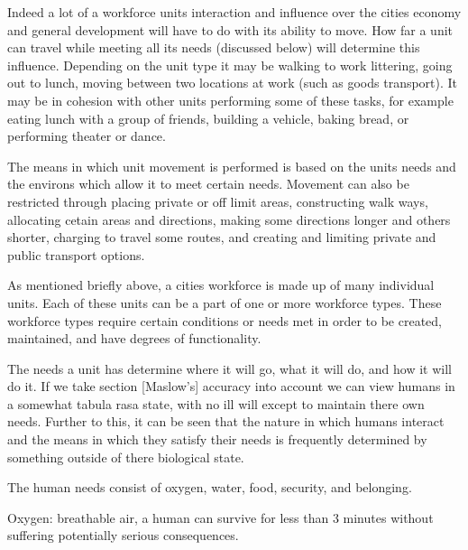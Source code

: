 Indeed a lot of a workforce units interaction and influence over the cities economy and general development will have to do with its ability to move. How far a unit can travel while meeting all its needs (discussed below) will determine this influence. Depending on the unit type it may be walking to work littering, going out to lunch, moving between two locations at work (such as goods transport). It may be in cohesion with other units performing some of these tasks, for example eating lunch with a group of friends, building a vehicle, baking bread, or performing theater or dance. 

The means in which unit movement is performed is based on the units needs and the environs which allow it to meet certain needs. Movement can also be restricted through placing private or off limit areas, constructing walk ways, allocating cetain areas and directions, making some directions longer and others shorter, charging to travel some routes, and creating and limiting private and public transport options. 





As mentioned briefly above, a cities workforce is made up of many individual units. Each of these units can be a part of one or more workforce types. These workforce types require certain conditions or needs met in order to be created, maintained, and have degrees of functionality. 

The needs a unit has determine where it will go, what it will do, and how it will do it. If we take section [Maslow's] accuracy into account we can view humans in a somewhat tabula rasa state, with no ill will except to maintain there own needs. Further to this, it can be seen that the nature in which humans interact and the means in which they satisfy their needs is frequently determined by something outside of there biological state. 

The human needs consist of oxygen, water, food, security, and belonging.



Oxygen: breathable air, a human can survive for less than 3 minutes without suffering potentially serious consequences. 


